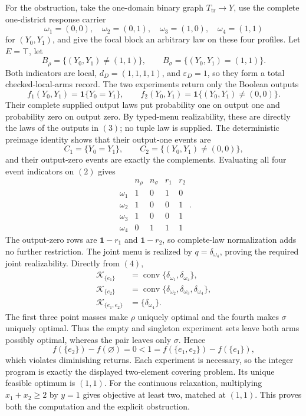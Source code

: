 For the obstruction, take the one-domain binary graph \(T_{\mathrm{tr}}\to Y\), use the complete one-district response carrier
\[
\omega_1=(0,0),\quad \omega_2=(0,1),\quad
\omega_3=(1,0),\quad \omega_4=(1,1)
\tag{2}
\]
for \((Y_0,Y_1)\), and give the focal block an arbitrary law on these four profiles.  Let \(E=\top\), let
\[
B_\rho=\{(Y_0,Y_1)\ne(1,1)\},
\qquad
B_\sigma=\{(Y_0,Y_1)=(1,1)\}.
\]
Both indicators are local, \(d_D=(1,1,1,1)\), and \(\varepsilon_D=1\), so they form a total checked-local-arms record.  The two experiments return only the Boolean outputs
\[
f_1(Y_0,Y_1)=\mathbf 1\{Y_0=Y_1\},
\qquad
f_2(Y_0,Y_1)=\mathbf 1\{(Y_0,Y_1)\ne(0,0)\}.
\tag{3}
\]
Their complete supplied output laws put probability one on output one and probability zero on output zero.  By typed-menu realizability, these are directly the laws of the outputs in \((3)\); no tuple law is supplied.  The deterministic preimage identity shows that their output-one events are
\[
C_1=\{Y_0=Y_1\},
\qquad
C_2=\{(Y_0,Y_1)\ne(0,0)\},
\]
and their output-zero events are exactly the complements.  Evaluating all four event indicators on \((2)\) gives
\[
\begin{array}{c|rrrr}
&n_\rho&n_\sigma&r_1&r_2\\\hline
\omega_1&1&0&1&0\\
\omega_2&1&0&0&1\\
\omega_3&1&0&0&1\\
\omega_4&0&1&1&1
\end{array}.
\tag{4}
\]
The output-zero rows are \(\mathbf 1-r_1\) and \(\mathbf 1-r_2\), so complete-law normalization adds no further restriction.  The joint menu is realized by \(q=\delta_{\omega_4}\), proving the required joint realizability.  Directly from \((4)\),
\[
\begin{split}
\mathcal K_{\{e_1\}}&=
\operatorname{conv}\{\delta_{\omega_1},\delta_{\omega_4}\},\\
\mathcal K_{\{e_2\}}&=
\operatorname{conv}\{\delta_{\omega_2},\delta_{\omega_3},
\delta_{\omega_4}\},\\
\mathcal K_{\{e_1,e_2\}}&=\{\delta_{\omega_4}\}.
\end{split}
\tag{5}
\]
The first three point masses make \(\rho\) uniquely optimal and the fourth makes \(\sigma\) uniquely optimal.  Thus the empty and singleton experiment sets leave both arms possibly optimal, whereas the pair leaves only \(\sigma\).  Hence
\[
f(\{e_2\})-f(\varnothing)=0
<1=f(\{e_1,e_2\})-f(\{e_1\}),
\]
which violates diminishing returns.  Each experiment is necessary, so the integer program is exactly the displayed two-element covering problem.  Its unique feasible optimum is \((1,1)\).  For the continuous relaxation, multiplying \(x_1+x_2\geq2\) by \(y=1\) gives objective at least two, matched at \((1,1)\).  This proves both the computation and the explicit obstruction.